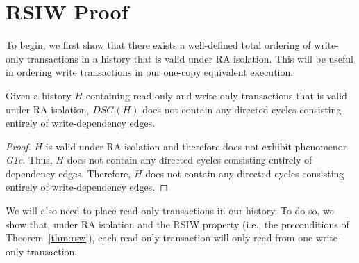 
\newcommand{\transform}{\textsc{Transform}\xspace}

\section{RSIW Proof}

\label{sec:rsiwproof}



To begin, we first show that there exists a well-defined total
ordering of write-only transactions in a history that is valid under
RA isolation. This will be useful in ordering write transactions in
our one-copy equivalent execution.

\begin{lemma}
\label{lemma:to}
  Given a history $H$ containing read-only and write-only transactions
  that is valid under RA isolation, $DSG(H)$ does not contain any
  directed cycles consisting entirely of write-dependency edges.
\end{lemma}
\begin{proof}
  $H$ is valid under RA isolation and therefore does not exhibit
  phenomenon \textit{G1c}. Thus, $H$ does not contain any directed
  cycles consisting entirely of dependency edges. Therefore, $H$ does
  not contain any directed cycles consisting entirely of
  write-dependency edges.
\end{proof}

We will also need to place read-only transactions in our history. To
do so, we show that, under RA isolation and the RSIW property (i.e.,
the preconditions of Theorem~\ref{thm:rsw}), each read-only
transaction will only read from one write-only transaction.

